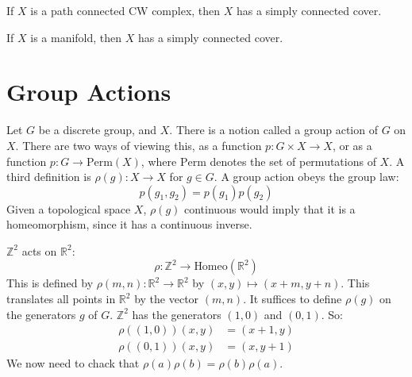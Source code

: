 \documentclass{book}                                                           %
\begin{document}
            \begin{theorem}
                If $X$ is a path connected CW complex, then
                $X$ has a simply connected cover.
            \end{theorem}
            \begin{theorem}
                If $X$ is a manifold, then $X$ has a simply
                connected cover.
            \end{theorem}
        \section{Group Actions}
            Let $G$ be a discrete group, and $X$. There is a notion
            called a group action of $G$ on $X$. There are two ways
            of viewing this, as a function
            $p:G\times{X}\rightarrow{X}$, or as a function
            $p:G\rightarrow\textrm{Perm}(X)$, where $\textrm{Perm}$
            denotes the set of permutations of $X$. A third definition
            is $\rho(g):X\rightarrow{X}$ for $g\in{G}$.
            A group action obeys the group law:
            \begin{equation}
                p(g_{1},g_{2})=p(g_{1})p(g_{2})
            \end{equation}
            Given a topological space $X$, $\rho(g)$ continuous
            would imply that it is a homeomorphism, since it has
            a continuous inverse.
            \begin{example}
                $\mathbb{Z}^{2}$ acts on $\mathbb{R}^{2}$:
                \begin{equation}
                    \rho:\mathbb{Z}^{2}\rightarrow
                    \textrm{Homeo}(\mathbb{R}^{2})
                \end{equation}
                This is defined by
                $\rho(m,n):\mathbb{R}^{2}\rightarrow\mathbb{R}^{2}$
                by $(x,y)\mapsto(x+m,y+n)$. This translates all points
                in $\mathbb{R}^{2}$ by the vector $(m,n)$. It suffices
                to define $\rho(g)$ on the generators $g$ of $G$.
                $\mathbb{Z}^{2}$ has the generators $(1,0)$ and $(0,1)$.
                So:
                \begin{subequations}
                    \begin{align}
                        \rho((1,0))(x,y)&=(x+1,y)\\
                        \rho((0,1))(x,y)&=(x,y+1)
                    \end{align}
                \end{subequations}
                We now need to chack that
                $\rho(a)\rho(b)=\rho(b)\rho(a)$.
            \end{example}
\end{document}
